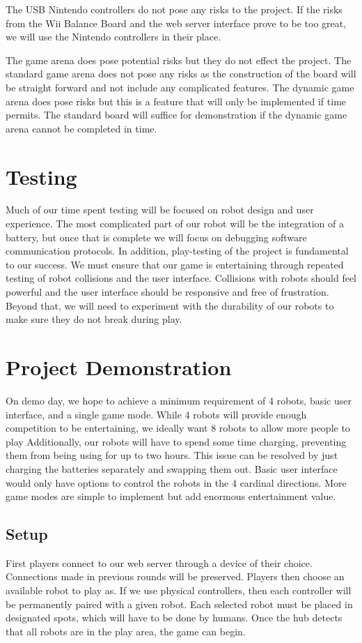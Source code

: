 \documentclass[11pt]{ieeeconf}
\begin{document}
The USB Nintendo controllers do not pose any risks to the project. If the risks from the Wii Balance Board and the web server interface prove to be too great, we will use the Nintendo controllers in their place.  

The game arena does pose potential risks but they do not effect the project. The standard game arena does not pose any risks as the construction of the board will be straight forward and not include any complicated features. The dynamic game arena does pose risks but this is a feature that will only be implemented if time permits. The standard board will suffice for demonstration if the dynamic game arena cannot be completed in time.

\section{Testing}
Much of our time spent testing will be focused on robot design and user experience. The most complicated part of our robot will be the integration of a battery, but once that is complete we will focus on debugging software communication protocols. In addition, play-testing of the project is fundamental to our success. We must ensure that our game is entertaining through repeated testing of robot collisions and the user interface. Collisions with robots should feel powerful and the user interface should be responsive and free of frustration. Beyond that, we will need to experiment with the durability of our robots to make sure they do not break during play.

\section{Project Demonstration}

On demo day, we hope to achieve a minimum requirement of 4 robots, basic user interface, and a single game mode. While 4 robots will provide enough competition to be entertaining, we ideally want 8 robots to allow more people to play Additionally, our robots will have to spend some time charging, preventing them from being using for up to two hours. This issue can be resolved by just charging the batteries separately and swapping them out. Basic user interface would only have options to control the robots in the 4 cardinal directions. More game modes are simple to implement but add enormous entertainment value.

\subsection{Setup}
First players connect to our web server through a device of their choice. Connections made in previous rounds will be preserved. Players then choose an available robot to play as. If we use physical controllers, then each controller will be permanently paired with a given robot. Each selected robot must be placed in designated spots, which will have to be done by humans. Once the hub detects that all robots are in the play area, the game can begin. 
\end{document}
